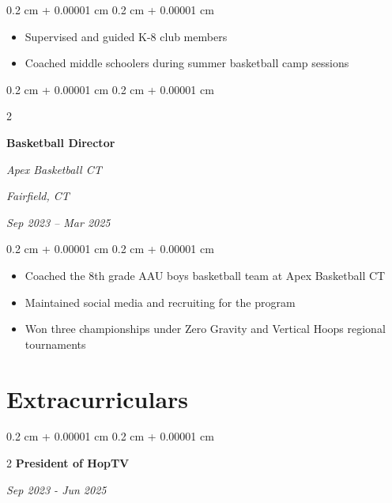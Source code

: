 \documentclass[10pt, letterpaper]{article}
\newenvironment{highlights}{
    \begin{itemize}[
        topsep=0.10 cm,
        parsep=0.10 cm,
        partopsep=0pt,
        itemsep=0pt,
        leftmargin=0.4 cm + 10pt
    ]
}{
    \end{itemize}
} %
\newenvironment{onecolentry}{
    \begin{adjustwidth}{
        0.2 cm + 0.00001 cm
    }{
        0.2 cm + 0.00001 cm
    }
}{
    \end{adjustwidth}
} %
\newenvironment{twocolentry}[2][]{
    \onecolentry
    \def\secondColumn{#2}
    \setcolumnwidth{\fill, 4.5 cm}
    \begin{paracol}{2}
}{
    \switchcolumn \raggedleft \secondColumn
    \end{paracol}
    \endonecolentry
} %
\begin{document}
            \vspace{0.10 cm}
            \begin{onecolentry}
                \begin{highlights}
                    \item Supervised and guided K-8 club members
                    \item Coached middle schoolers during summer basketball camp sessions
                \end{highlights}
            \end{onecolentry}

        \vspace{0.2 cm}


        \begin{twocolentry}{
        \textit{Fairfield, CT}    
            
        \textit{Sep 2023 – Mar 2025}}
            \textbf{Basketball Director}
            
            \textit{Apex Basketball CT}
        \end{twocolentry}

        \vspace{0.10 cm}
        \begin{onecolentry}
            \begin{highlights}
                \item Coached the 8th grade AAU boys basketball team at Apex Basketball CT
                \item Maintained social media and recruiting for the program
                \item Won three championships under Zero Gravity and Vertical Hoops regional tournaments
            \end{highlights}
        \end{onecolentry}

       
       
 

    \section{Extracurriculars}
    
             \begin{twocolentry}{\textit{Sep 2023 - Jun 2025 }}{\textbf{President of HopTV}}
    \end{twocolentry}
    
    \vspace{0.10 cm}
    
\end{document}
